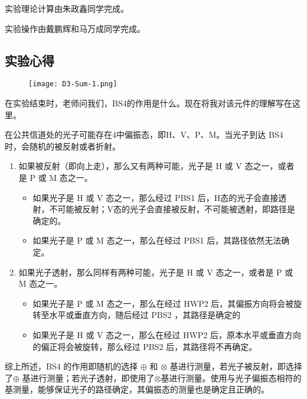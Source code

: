 \documentclass[dvipsnames, svgnames,a4paper,11pt]{article}
\begin{document}
		实验理论计算由朱政鑫同学完成。

		实验操作由戴鹏辉和马万成同学完成。


	\subsection{实验心得}

	\begin{figure}[H]
		\centering
		\texttt{[image: D3-Sum-1.png]}
		\label{fig:D3-1-3}
	\end{figure}

	在实验结束时，老师问我们，BS4的作用是什么。现在将我对该元件的理解写在这里。

	在公共信道处的光子可能存在4中偏振态，即H、V、P、M。当光子到达 BS4 时，会随机的被反射或者折射。
	\begin{enumerate}
		\item 如果被反射（即向上走），那么又有两种可能，光子是 H 或 V 态之一，或者是 P 或 M 态之一。
			\begin{itemize}
				\item 如果光子是 H 或 V 态之一，那么经过 PBS1 后，H态的光子会直接透射，不可能被反射；V态的光子会直接被反射，不可能被透射，即路径是确定的。
				\item 如果光子是 P 或 M 态之一，那么在经过 PBS1 后，其路径依然无法确定。
			\end{itemize}
		
		\item 如果光子透射，那么同样有两种可能，光子是 H 或 V 态之一，或者是 P 或 M 态之一。
		\begin{itemize}
			\item 如果光子是 P 或 M 态之一，那么在经过 HWP2 后，其偏振方向将会被旋转至水平或垂直方向，随后经过 PBS2 ，其路径是确定的
			\item 如果光子是 H 或 V 态之一，那么在经过 HWP2 后，原本水平或垂直方向的偏正将会被旋转，那么经过 PBS2 后，其路径将不再确定。
		\end{itemize}
	\end{enumerate}

	综上所述，BS4 的作用即随机的选择 $\oplus$ 和 $\otimes$ 基进行测量，若光子被反射，即选择了$\oplus$ 基进行测量；若光子透射，即使用了$\otimes$基进行测量。使用与光子偏振态相符的基测量，能够保证光子的路径确定，其偏振态的测量也是确定且正确的。
	
\end{document}
